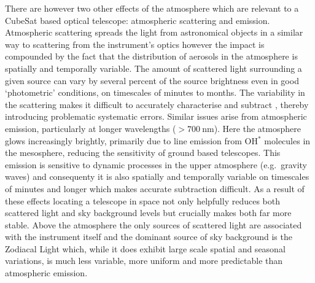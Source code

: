 \documentclass[]{iac}
\begin{document}
There are however two other effects of the atmosphere which are relevant to a CubeSat based optical telescope:
atmospheric scattering and emission.  Atmospheric scattering spreads the light from astronomical objects in a similar
way to scattering from the instrument's optics however the impact is compounded by the fact that the distribution of
aerosols in the atmosphere is spatially and temporally variable. The amount of scattered light surrounding a given
source can vary by several percent of the source brightness even in good `photometric' conditions, on timescales of
minutes to months. The variability in the scattering makes it difficult to accurately characterise and subtract
\cite{McGraw2010}, thereby introducing problematic systematic errors.  Similar issues arise from atmospheric emission,
particularly at longer wavelengths ($>\SI{700}{\nano\metre}$). Here the atmosphere glows increasingly brightly,
primarily due to line emission from OH$^*$ molecules in the mesosphere, reducing the sensitivity of ground based
telescopes. This emission is sensitive to dynamic processes in the upper atmosphere (e.g.\ gravity waves) and
consequenty it is also spatially and temporally variable on timescales of minutes and longer \cite{Moreels2008} which
makes accurate subtraction difficult.  As a result of these effects locating a telescope in space not only helpfully
reduces both scattered light and sky background levels but crucially makes both far more stable.  Above the atmosphere
the only sources of scattered light are associated with the instrument itself and the dominant source of sky background
is the Zodiacal Light \cite{Leinert1998} which, while it does exhibit large scale spatial and seasonal variations, is
much less variable, more uniform and more predictable than atmospheric emission.
\end{document}
